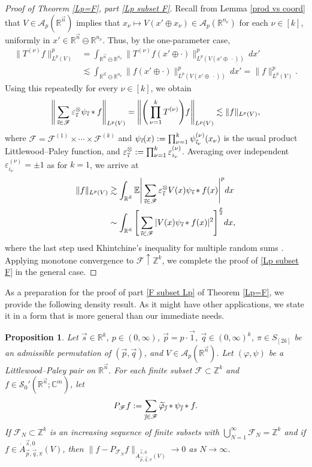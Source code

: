 \documentclass[11pt, reqno]{amsart}
\newtheorem{proposition}[theorem]{Proposition}
\theoremstyle{definition}
\theoremstyle{remark}
\numberwithin{equation}{section}
\newcommand{\A}{\mathscr A}
\newcommand{\C}{\mathbb C}
\newcommand{\E}{\mathbb E}
\newcommand{\Fs}{\mathscr F}
\newcommand{\R}{\mathbb R}
\newcommand{\Sc}{\mathscr S}
\newcommand{\Z}{\mathbb Z}
\newcommand{\vone}{\vec 1}
\newcommand{\vi}{\vec{\textit{\i}}}
\newcommand{\vj}{\vec{\textit{\j}}}
\newcommand{\vn}{\vec n}
\newcommand{\vp}{\vec p}
\newcommand{\vq}{\vec q}
\newcommand{\vs}{\vec s}
\newcommand{\eps}{\varepsilon}
\newcommand{\abs}[1]{|#1|}
\newcommand{\Norm}[2]{\|#1\|_{#2}}
\begin{document}
\begin{proof}[Proof of Theorem \ref{Lp=F}, part \eqref{Lp subset F}]
Recall from Lemma \ref{prod vs coord} that $V\in\A_p(\R^{\vn})$ implies that $x_\nu\mapsto V(x'\oplus x_\nu)\in\A_p(\R^{n_{\nu}})$ for each $\nu\in[k]$, uniformly in $x'\in\R^{\vn}\ominus\R^{n_{\nu}}$. Thus, by the one-parameter case,
\begin{align*}
\Norm{T^{(\nu)}f}{L^p(V)}^p
&=\int_{\R^{\vn}\ominus\R^{n_{\nu}}}\Norm{T^{(\nu)}f(x'\oplus\cdot)}{L^p(V(x'\oplus\ \cdot))}^p \, dx' \\
&\lesssim\int_{\R^{\vn}\ominus\R^{n_{\nu}}}\Norm{f(x'\oplus\cdot)}{L^p(V(x'\oplus\ \cdot))}^p \, dx'
=\Norm{f}{L^p(V)}^p.
\end{align*}
Using this repeatedly for every $\nu\in[k]$, we obtain
\begin{equation*}
\Bigg\|\sum_{\vi\in\Fs}\eps^{\otimes}_{\vi}\psi_{\vi}*f\Bigg\|_{L^p(V)}
=\Bigg\|\Bigg(\prod_{\nu=1}^k T^{(\nu)}\Bigg)f\Bigg\|_{L^p(V)}
\lesssim\Norm{f}{L^p(V)},
\end{equation*}
where $\Fs=\Fs^{(1)}\times\cdots\times\Fs^{(k)}$ and $\psi_{\vi}(x):=\prod_{\nu=1}^k\psi_{\vi_\nu}^{(\nu)}(x_{\nu})$ is the usual product Littlewood--Paley function, and $\eps^{\otimes}_{\vi}:=\prod_{\nu=1}^k\eps^{(\nu)}_{i_\nu}$. Averaging over independent $\eps^{(\nu)}_{i_\nu}=\pm 1$ as for $k=1$, we arrive at
\begin{equation*}
\begin{split}
\Norm{f}{L^p(V)}
&\gtrsim\int_{\R^{\vn}}\E\Bigg|\sum_{\vi\in\Fs}\eps^{\otimes}_{\vi}V(x)\psi_{\vi}*f(x)\Bigg|^p dx \\
&\sim\int_{\R^{\vn}}\Bigg[\sum_{\vi\in\Fs}\abs{V(x)\psi_{\vi}*f(x)}^2\Bigg]^{\frac{p}{2}} dx,
\end{split}
\end{equation*}
where the last step used Khintchine's inequality for multiple random sums  \cite[Section C.5]{Graf-clas}. Applying monotone convergence to $\Fs\uparrow\Z^k$, we complete the proof of \eqref{Lp subset F} in the general case.
\end{proof}

As a preparation for the proof of part \eqref{F subset Lp} of Theorem \ref{Lp=F}, we provide the following density result. As it might have other applications, we state it in a form that is more general than our immediate needs.

\begin{proposition}\label{density}
Let $\vs\in\R^k$, $p\in(0,\infty)$, $\vp=p\cdot\vone$, $\vq\in(0,\infty)^k$, $\pi\in S_{[2k]}$ be an admissible permutation of $(\vp,\vq)$, and $V\in\A_p(\R^{\vn})$.
Let $(\varphi,\psi)$ be a Littlewood--Paley pair on $\R^{\vn}$.
For each finite subset $\Fs \subset\Z^k$ and $f\in\Sc_0'(\R^{\vn};\C^m)$, let
\begin{equation*}
P_{\Fs} f:=\sum_{\vj\in\Fs}\widetilde\varphi_{\vj}*\psi_{\vj}*f.
\end{equation*}
If $\Fs_N\subset\Z^k$ is an increasing sequence of finite subsets with $\bigcup_{N=1}^\infty\Fs_N=\Z^k$
and if $f\in \dot A_{\vec p,\vec q,\pi}^{\vec s,0}(V)$, then $\Norm{f-P_{\Fs_N} f}{\dot A_{\vec p,\vec q,\pi}^{\vec s,0}(V)}\to 0$ as $N\to\infty$.
\end{proposition}
\end{document}
